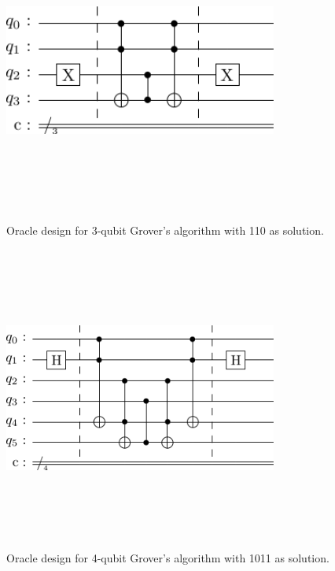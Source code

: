 \documentclass[conference]{IEEEtran}
\begin{document}
\begin{figure}[htbp]
	\centerline{\includegraphics[width=9cm,height=10cm,keepaspectratio]{3-qubit.png}}
	\caption{Oracle design for 3-qubit Grover’s algorithm with 110 as solution.}
	\label{fig}
\end{figure}

\begin{figure}[htbp]
	\centerline{\includegraphics[width=9cm,height=10cm,keepaspectratio]{4-qubit.png}}
	\caption{Oracle design for 4-qubit Grover’s algorithm with 1011 as solution.}
	\label{fig}
\end{figure}
\end{document}

